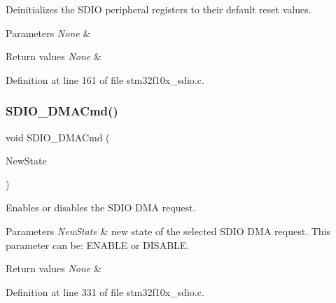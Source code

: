 Deinitializes the S\+D\+IO peripheral registers to their default reset values. 


\begin{DoxyParams}{Parameters}
{\em None} & \\
\hline
\end{DoxyParams}

\begin{DoxyRetVals}{Return values}
{\em None} & \\
\hline
\end{DoxyRetVals}


Definition at line 161 of file stm32f10x\+\_\+sdio.\+c.

\mbox{\label{group___s_d_i_o___private___functions_gad36fde5ec0ce0c2089b9d971c2271e6e}} 
\subsubsection{\texorpdfstring{S\+D\+I\+O\+\_\+\+D\+M\+A\+Cmd()}{SDIO\_DMACmd()}}
{\footnotesize\ttfamily void S\+D\+I\+O\+\_\+\+D\+M\+A\+Cmd (\begin{DoxyParamCaption}\item[{\hyperlink{group___exported__types_gac9a7e9a35d2513ec15c3b537aaa4fba1}{Functional\+State}}]{New\+State }\end{DoxyParamCaption})}



Enables or disables the S\+D\+IO D\+MA request. 


\begin{DoxyParams}{Parameters}
{\em New\+State} & new state of the selected S\+D\+IO D\+MA request. This parameter can be\+: E\+N\+A\+B\+LE or D\+I\+S\+A\+B\+LE. \\
\hline
\end{DoxyParams}

\begin{DoxyRetVals}{Return values}
{\em None} & \\
\hline
\end{DoxyRetVals}


Definition at line 331 of file stm32f10x\+\_\+sdio.\+c.

